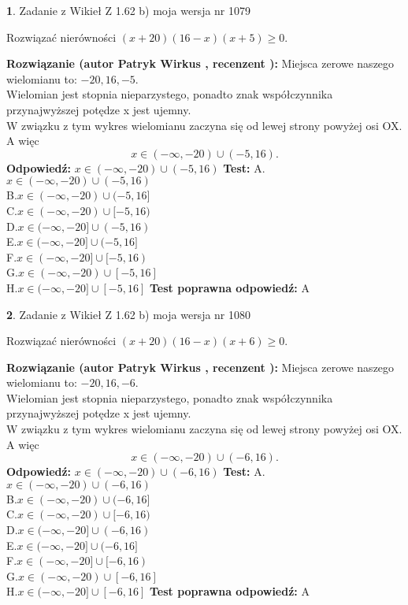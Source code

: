 \documentclass[12pt, a4paper]{article}
\theoremstyle{definition} %
\newtheorem{zad}{}
\newcommand{\zadStart}[1]{\begin{zad}#1\newline}
\newcommand{\zadStop}{\end{zad}}
\newcommand{\rozwStart}[2]{\noindent \textbf{Rozwiązanie (autor #1 , recenzent #2): }\newline}
\newcommand{\rozwStop}{\newline}
\newcommand{\odpStart}{\noindent \textbf{Odpowiedź:}\newline}
\newcommand{\odpStop}{\newline}
\newcommand{\testStart}{\noindent \textbf{Test:}\newline}
\newcommand{\testStop}{\newline}
\newcommand{\kluczStart}{\noindent \textbf{Test poprawna odpowiedź:}\newline}
\newcommand{\kluczStop}{\newline}
\begin{document}
\zadStart{Zadanie z Wikieł Z 1.62 b) moja wersja nr 1079}

Rozwiązać nierówności $(x+20)(16-x)(x+5)\ge0$.
\zadStop
\rozwStart{Patryk Wirkus}{}
Miejsca zerowe naszego wielomianu to: $-20, 16, -5$.\\
Wielomian jest stopnia nieparzystego, ponadto znak współczynnika przy\linebreak najwyższej potędze x jest ujemny.\\ W związku z tym wykres wielomianu zaczyna się od lewej strony powyżej osi OX. A więc $$x \in (-\infty,-20) \cup (-5,16).$$
\rozwStop
\odpStart
$x \in (-\infty,-20) \cup (-5,16)$
\odpStop
\testStart
A.$x \in (-\infty,-20) \cup (-5,16)$\\
B.$x \in (-\infty,-20) \cup (-5,16]$\\
C.$x \in (-\infty,-20) \cup [-5,16)$\\
D.$x \in (-\infty,-20] \cup (-5,16)$\\
E.$x \in (-\infty,-20] \cup (-5,16]$\\
F.$x \in (-\infty,-20] \cup [-5,16)$\\
G.$x \in (-\infty,-20) \cup [-5,16]$\\
H.$x \in (-\infty,-20] \cup [-5,16]$
\testStop
\kluczStart
A
\kluczStop



\zadStart{Zadanie z Wikieł Z 1.62 b) moja wersja nr 1080}

Rozwiązać nierówności $(x+20)(16-x)(x+6)\ge0$.
\zadStop
\rozwStart{Patryk Wirkus}{}
Miejsca zerowe naszego wielomianu to: $-20, 16, -6$.\\
Wielomian jest stopnia nieparzystego, ponadto znak współczynnika przy\linebreak najwyższej potędze x jest ujemny.\\ W związku z tym wykres wielomianu zaczyna się od lewej strony powyżej osi OX. A więc $$x \in (-\infty,-20) \cup (-6,16).$$
\rozwStop
\odpStart
$x \in (-\infty,-20) \cup (-6,16)$
\odpStop
\testStart
A.$x \in (-\infty,-20) \cup (-6,16)$\\
B.$x \in (-\infty,-20) \cup (-6,16]$\\
C.$x \in (-\infty,-20) \cup [-6,16)$\\
D.$x \in (-\infty,-20] \cup (-6,16)$\\
E.$x \in (-\infty,-20] \cup (-6,16]$\\
F.$x \in (-\infty,-20] \cup [-6,16)$\\
G.$x \in (-\infty,-20) \cup [-6,16]$\\
H.$x \in (-\infty,-20] \cup [-6,16]$
\testStop
\kluczStart
A
\kluczStop
\end{document}
